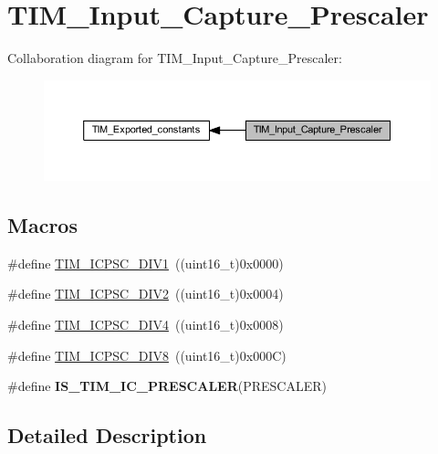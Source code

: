 \hypertarget{group___t_i_m___input___capture___prescaler}{}\section{T\+I\+M\+\_\+\+Input\+\_\+\+Capture\+\_\+\+Prescaler}
\label{group___t_i_m___input___capture___prescaler}
Collaboration diagram for T\+I\+M\+\_\+\+Input\+\_\+\+Capture\+\_\+\+Prescaler\+:\nopagebreak
\begin{figure}[H]
\begin{center}
\leavevmode
\includegraphics[width=350pt]{group___t_i_m___input___capture___prescaler}
\end{center}
\end{figure}
\subsection*{Macros}
\begin{DoxyCompactItemize}
\item 
\#define \hyperlink{group___t_i_m___input___capture___prescaler_ga8acb44abe3147d883685c1f9f1ce410e}{T\+I\+M\+\_\+\+I\+C\+P\+S\+C\+\_\+\+D\+I\+V1}~((uint16\+\_\+t)0x0000)
\item 
\#define \hyperlink{group___t_i_m___input___capture___prescaler_ga1d8a7b66add914e2ddd910d2d700978f}{T\+I\+M\+\_\+\+I\+C\+P\+S\+C\+\_\+\+D\+I\+V2}~((uint16\+\_\+t)0x0004)
\item 
\#define \hyperlink{group___t_i_m___input___capture___prescaler_gaf5a675046430fa0f0c95b0dac612828f}{T\+I\+M\+\_\+\+I\+C\+P\+S\+C\+\_\+\+D\+I\+V4}~((uint16\+\_\+t)0x0008)
\item 
\#define \hyperlink{group___t_i_m___input___capture___prescaler_ga5086cb03c89a5c67b199d20b605f00cb}{T\+I\+M\+\_\+\+I\+C\+P\+S\+C\+\_\+\+D\+I\+V8}~((uint16\+\_\+t)0x000\+C)
\item 
\#define {\bfseries I\+S\+\_\+\+T\+I\+M\+\_\+\+I\+C\+\_\+\+P\+R\+E\+S\+C\+A\+L\+ER}(P\+R\+E\+S\+C\+A\+L\+ER)
\end{DoxyCompactItemize}


\subsection{Detailed Description}


